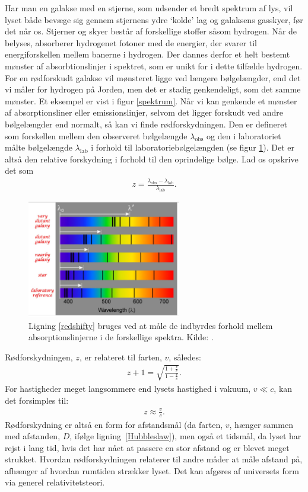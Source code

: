 Har man en galakse med en stjerne, som udsender et bredt spektrum af lys, vil lyset både bevæge sig gennem stjernens ydre `kolde' lag og galaksens gasskyer, før det når os. Stjerner og skyer består af forskellige stoffer såsom hydrogen. Når de belyses, absorberer hydrogenet fotoner med de energier, der svarer til energiforskellen mellem banerne i hydrogen. Der dannes derfor et helt bestemt mønster af absorbtionslinjer i spektret, som er unikt for i dette tilfælde hydrogen. For en rødforskudt galakse vil mønsteret ligge ved længere bølgelængder, end det vi måler for hydrogen på Jorden, men det er stadig genkendeligt, som det samme mønster. Et eksempel er vist i figur \ref{spektrum}. Når vi kan genkende et mønster af absorptionsliner eller emissionslinjer, selvom det ligger forskudt ved andre bølgelængder end normalt, så kan vi finde rødforskydningen. Den er defineret som forskellen mellem den observeret bølgelængde $\lambda_\text{obs}$ og den i laboratoriet målte bølgelængde $\lambda_\text{lab}$ i forhold til laboratoriebølgelængden (se figur \ref{redshiftmeasure}). Det er altså den relative forskydning i forhold til den oprindelige bølge. Lad os opskrive det som
%
\begin{align}
z=\frac{\lambda_\text{obs}-\lambda_\text{lab}}{\lambda_\text{lab}}. \label{redshifty}
\end{align}
%
\begin{figure}
	\centering
	\includegraphics[width=0.6\textwidth]{Kosmo/2017/img/redshiftcomparison.jpg}
	\caption{Ligning \eqref{redshifty} bruges ved at måle de indbyrdes forhold mellem absorptionslinjerne i de forskellige spektra. Kilde: \cite{SNC1DEarthSpace}.}
	\label{redshiftmeasure}
\end{figure}
%
Rødforskydningen, $z$, er relateret til farten, $v$, således:
\begin{align}
z+1=\sqrt{\frac{1+\frac{v}{c}}{1-\frac{v}{c}}}.
\end{align}
For hastigheder meget langsommere end lysets hastighed i vakuum, $v \ll c$, kan det forsimples til:
\begin{align}
z\approx\frac{v}{c}.
\end{align}
%
Rødforskydning er altså en form for afstandsmål (da farten, $v$, hænger sammen med afstanden, $D$, ifølge ligning~\eqref{Hubbleslaw}), men også et tidsmål, da lyset har rejst i lang tid, hvis det har nået at passere en stor afstand og er blevet meget strukket. Hvordan rødforskydningen relaterer til andre måder at måle afstand på, afhænger af hvordan rumtiden strækker lyset. Det kan afgøres af universets form via generel relativitetsteori.

